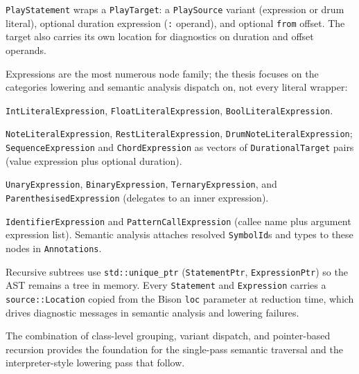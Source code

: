  \texttt{PlayStatement} wraps a \texttt{PlayTarget}: a \texttt{PlaySource} variant
(expression or drum literal), optional duration expression (\texttt{:} operand), and optional \texttt{from} offset.
The target also carries its own location for diagnostics on duration and offset operands.

Expressions are the most numerous node family; the thesis focuses on the categories lowering and semantic analysis
dispatch on, not every literal wrapper:

 \texttt{IntLiteralExpression}, \texttt{FloatLiteralExpression},
\texttt{BoolLiteralExpression}.

 \texttt{NoteLiteralExpression}, \texttt{RestLiteralExpression},
\texttt{DrumNoteLiteralExpression}; \texttt{SequenceExpression} and \texttt{ChordExpression} as vectors of
\texttt{DurationalTarget} pairs (value expression plus optional duration).

 \texttt{UnaryExpression}, \texttt{BinaryExpression}, \texttt{TernaryExpression}, and
\texttt{ParenthesisedExpression} (delegates to an inner expression).

 \texttt{IdentifierExpression} and \texttt{PatternCallExpression} (callee
name plus argument expression list).
Semantic analysis attaches resolved \texttt{SymbolId}s and types to these nodes in \texttt{Annotations}.

Recursive subtrees use \texttt{std::unique\_ptr} (\texttt{StatementPtr}, \texttt{ExpressionPtr}) so the AST remains a
tree in memory.
Every \texttt{Statement} and \texttt{Expression} carries a \texttt{source::Location} copied from the Bison \texttt{loc}
parameter at reduction time, which drives diagnostic messages in semantic analysis and lowering failures.

The combination of class-level grouping, variant dispatch, and pointer-based recursion provides the foundation for the
single-pass semantic traversal and the interpreter-style lowering pass that follow.
